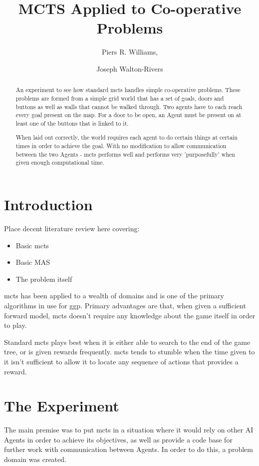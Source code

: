 \documentclass{IEEEtran}
\author{Piers R. Williams, \and Joseph Walton-Rivers}
\title{MCTS Applied to Co-operative Problems}
\begin{document}
\maketitle
\begin{abstract}
An experiment to see how standard \gls{mcts} handles simple co-operative problems.	These problems are formed from a simple grid world that has a set of goals, doors and buttons as well as walls that cannot be walked through. Two agents have to each reach every goal present on the map. For a door to be open, an Agent must be present on at least one of the buttons that is linked to it.

When laid out correctly, the world requires each agent to do certain things at certain times in order to achieve the goal. With no modification to allow communication between the two Agents - \gls{mcts} performs well and performs very 'purposefully' when given enough computational time.
\end{abstract}

\section{Introduction}
Place decent literature review here covering:
\begin{itemize}
\item{Basic \gls{mcts}}
\item{Basic MAS}
\item{The problem itself}
\end{itemize}

\gls{mcts} has been applied to a wealth of domains and is one of the primary algorithms in use for \gls{ggp}. Primary advantages are that, when given a sufficient forward model, \gls{mcts} doesn't require any knowledge about the game itself in order to play.

Standard \gls{mcts} plays best when it is either able to search to the end of the game tree, or is given rewards frequently. \gls{mcts} tends to stumble when the time given to it isn't sufficient to allow it to locate any sequence of actions that provides a reward.

\section{The Experiment}
The main premise was to put \gls{mcts} in a situation where it would rely on other AI Agents in order to achieve its objectives, as well as provide a code base for further work with communication between Agents. In order to do this, a problem domain was created.
\end{document}
